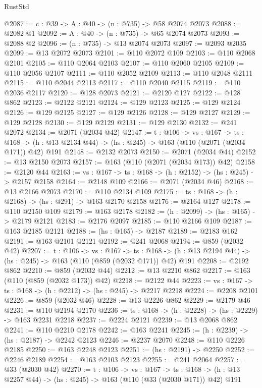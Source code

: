 \begin{lexlean}{RustStd}
\begin{coremodule}
@2087 := {c : @39} -> {A : @40} -> (n : @735) -> @58 @2074 @2073
@2088 := @2082 @1
@2092 := {A : @40} -> (n : @735) -> @65 @2074 @2073
@2093 := @2088 @2
@2096 := (n : @735) -> @13 @2074 @2073
@2097 := @2093 @2035
@2099 := @13 @2072 @2073
@2101 := @110 @2072 @109
@2103 := @110 @2068 @2101
@2105 := @110 @2064 @2103
@2107 := @110 @2060 @2105
@2109 := @110 @2056 @2107
@2111 := @110 @2052 @2109
@2113 := @110 @2048 @2111
@2115 := @110 @2044 @2113
@2117 := @110 @2040 @2115
@2119 := @110 @2036 @2117
@2120 := @128 @2073
@2121 := @2120 @127
@2122 := @128 @862
@2123 := @2122 @2121
@2124 := @129 @2123
@2125 := @129 @2124
@2126 := @129 @2125
@2127 := @129 @2126
@2128 := @129 @2127
@2129 := @129 @2128
@2130 := @129 @2129
@2131 := @129 @2130
@2132 := @241 @2072
@2134 := @2071 (@2034 @42)
@2147 := {t : @106} ->
  {vs : @167} ->
  {ts : @168} -> (h : @13 @2134 @44) -> (hs : @245) -> @163 (@110 (@2071 (@2034 @171)) @42) @191
@2148 := @2132 @2073
@2150 := @2071 (@2034 @44)
@2152 := @13 @2150 @2073
@2157 := @163 (@110 (@2071 (@2034 @173)) @42)
@2158 := @2120 @44
@2163 := {vs : @167} -> {ts : @168} -> (h : @2152) -> (hs : @245) -> @2157 @2158
@2164 := @2148 @109
@2166 := @2071 (@2034 @46)
@2168 := @13 @2166 @2073
@2170 := @110 @2134 @109
@2175 := {ts : @168} -> (h : @2168) -> (hs : @291) -> @163 @2170 @2158
@2176 := @2164 @127
@2178 := @110 @2150 @109
@2179 := @163 @2178
@2182 := (h : @2099) -> (hs : @165) -> @2179 @2121
@2183 := @2176 @2097
@2185 := @110 @2166 @109
@2187 := @163 @2185 @2121
@2188 := (hs : @165) -> @2187
@2189 := @2183 @162
@2191 := @163 @2101 @2121
@2192 := @241 @2068
@2194 := @859 (@2032 @42)
@2207 := {t : @106} ->
  {vs : @167} ->
  {ts : @168} -> (h : @13 @2194 @44) -> (hs : @245) -> @163 (@110 (@859 (@2032 @171)) @42) @191
@2208 := @2192 @862
@2210 := @859 (@2032 @44)
@2212 := @13 @2210 @862
@2217 := @163 (@110 (@859 (@2032 @173)) @42)
@2218 := @2122 @44
@2223 := {vs : @167} -> {ts : @168} -> (h : @2212) -> (hs : @245) -> @2217 @2218
@2224 := @2208 @2101
@2226 := @859 (@2032 @46)
@2228 := @13 @2226 @862
@2229 := @2179 @46
@2231 := @110 @2194 @2170
@2236 := {ts : @168} -> (h : @2228) -> (hs : @2229) -> @163 @2231 @2218
@2237 := @2224 @2121
@2239 := @13 @2068 @862
@2241 := @110 @2210 @2178
@2242 := @163 @2241
@2245 := (h : @2239) -> (hs : @2187) -> @2242 @2123
@2246 := @2237 @2070
@2248 := @110 @2226 @2185
@2250 := @163 @2248 @2123
@2251 := (hs : @2191) -> @2250
@2252 := @2246 @2189
@2254 := @163 @2103 @2123
@2255 := @241 @2064
@2257 := @33 (@2030 @42)
@2270 := {t : @106} ->
  {vs : @167} ->
  {ts : @168} -> (h : @13 @2257 @44) -> (hs : @245) -> @163 (@110 (@33 (@2030 @171)) @42) @191

\end{coremodule}
\end{lexlean}
